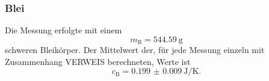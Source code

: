 \subsubsection*{Blei}
	
	Die Messung erfolgte mit einem
	\begin{equation}
		m_\text{B} = \SI{544.59}{\gram}
	\end{equation}
	schweren Bleikörper. Der Mittelwert der, für jede Messung einzeln mit Zusammenhang VERWEIS berechneten, Werte ist
	\begin{equation} 
		c_\text{B} = \SI{0.199(9)}{\joule\per\kelvin}.
	\end{equation}

